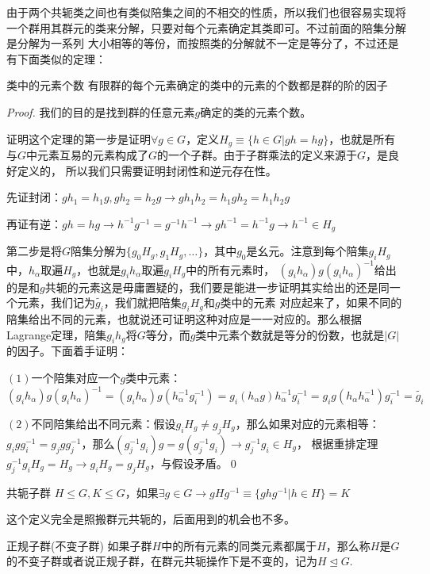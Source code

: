 由于两个共轭类之间也有类似陪集之间的不相交的性质，所以我们也很容易实现将一个群用其群元的类来分解，只要对每个元素确定其类即可。不过前面的陪集分解是分解为一系列
大小相等的等份，而按照类的分解就不一定是等分了，不过还是有下面类似的定理：
\begin{theorem}{类中的元素个数}
    有限群的每个元素确定的类中的元素的个数都是群的阶的因子
\end{theorem}
\begin{proof}
    我们的目的是找到群的任意元素$g$确定的类的元素个数。

    证明这个定理的第一步是证明$\forall g\in G$，定义$H_g\equiv\{h\in G|gh=hg\}$，也就是所有与$G$中元素互易的元素构成了$G$的一个子群。由于子群乘法的定义来源于$G$，是良好定义的，
    所以我们只需要证明封闭性和逆元存在性。

    先证封闭：$gh_1=h_1g,gh_2=h_2g\rightarrow gh_1h_2=h_1gh_2=h_1h_2g$

    再证有逆：$gh=hg\rightarrow h^{-1}g^{-1}=g^{-1}h^{-1}\rightarrow gh^{-1}=h^{-1}g\rightarrow h^{-1}\in H_g$

    第二步是将$G$陪集分解为$\{g_0H_g,g_1H_g,\ldots\}$，其中$g_0$是幺元。注意到每个陪集$g_iH_g$中，$h_\alpha$取遍$H_g$，也就是$g_i h_\alpha$取遍$g_iH_g$中的所有元素时，
    $(g_i h_\alpha )g(g_i h_\alpha )^{-1}$给出的是和$g$共轭的元素这是毋庸置疑的，我们要是能进一步证明其实给出的还是同一个元素，我们记为$\tilde{g_i}$，我们就把陪集$g_iH_g$和$g$类中的元素
    对应起来了，如果不同的陪集给出不同的元素，也就说还可证明这种对应是一一对应的。那么根据Lagrange定理，陪集$g_ih_g$将$G$等分，而$g$类中元素个数就是等分的份数，也就是$|G|$的因子。下面着手证明：

    $(1)$一个陪集对应一个$g$类中元素：$(g_i h_\alpha )g(g_i h_\alpha )^{-1}=(g_i h_\alpha )g( h_\alpha^{-1}g_i^{-1} )=g_i (h_\alpha g) h_\alpha^{-1}g_i^{-1}
    =g_i  g(h_\alpha h_\alpha^{-1})g_i^{-1} =\tilde{g_i}$
    
    $(2)$不同陪集给出不同元素：假设$g_iH_g\neq g_j H_g$，那么如果对应的元素相等：$g_igg_i^{-1}=g_jgg_j^{-1}$，那么$(g_j^{-1}g_i)g=g(g_j^{-1}g_i)\rightarrow g_j^{-1}g_i\in H_g$，
    根据重排定理$g_j^{-1}g_iH_g=H_g\rightarrow g_iH_g=g_jH_g$，与假设矛盾。\qed
\end{proof}
\begin{define}{共轭子群}
    $H\leq G,K\leq G$，如果$\exists g\in G\rightarrow gHg^{-1}\equiv\{ghg^{-1}|h\in H\}=K$
\end{define}
这个定义完全是照搬群元共轭的，后面用到的机会也不多。
\begin{define}{正规子群(不变子群)}
    如果子群$H$中的所有元素的同类元素都属于$H$，那么称$H$是$G$的不变子群或者说正规子群，在群元共轭操作下是不变的，记为$H\unlhd G$.
\end{define}

